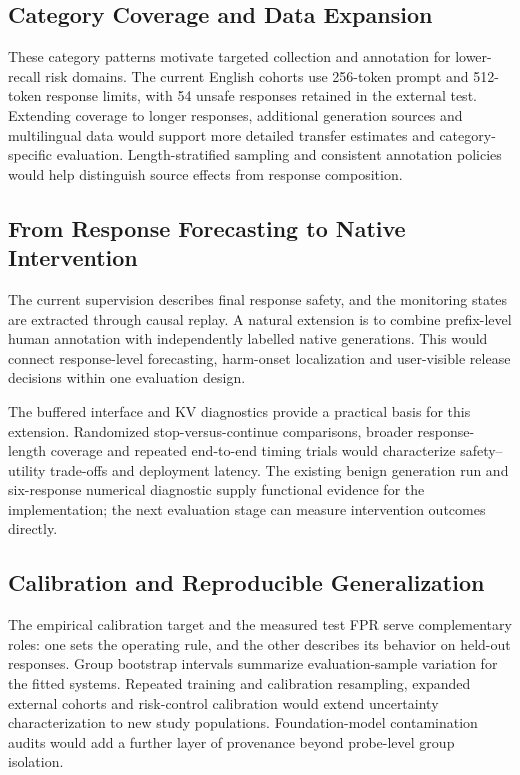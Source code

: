 \subsection{Category Coverage and Data Expansion}

These category patterns motivate targeted collection and annotation for lower-recall risk domains. The current English cohorts use 256-token prompt and 512-token response limits, with 54 unsafe responses retained in the external test. Extending coverage to longer responses, additional generation sources and multilingual data would support more detailed transfer estimates and category-specific evaluation. Length-stratified sampling and consistent annotation policies would help distinguish source effects from response composition.

\subsection{From Response Forecasting to Native Intervention}
The current supervision describes final response safety, and the monitoring states are extracted through causal replay. \TimingProfileEN{} A natural extension is to combine prefix-level human annotation with independently labelled native generations. This would connect response-level forecasting, harm-onset localization and user-visible release decisions within one evaluation design.

The buffered interface and KV diagnostics provide a practical basis for this extension. Randomized stop-versus-continue comparisons, broader response-length coverage and repeated end-to-end timing trials would characterize safety--utility trade-offs and deployment latency. The existing benign generation run and six-response numerical diagnostic supply functional evidence for the implementation; the next evaluation stage can measure intervention outcomes directly.

\subsection{Calibration and Reproducible Generalization}
The empirical calibration target and the measured test FPR serve complementary roles: one sets the operating rule, and the other describes its behavior on held-out responses. Group bootstrap intervals summarize evaluation-sample variation for the fitted systems. Repeated training and calibration resampling, expanded external cohorts and risk-control calibration would extend uncertainty characterization to new study populations. Foundation-model contamination audits would add a further layer of provenance beyond probe-level group isolation.

